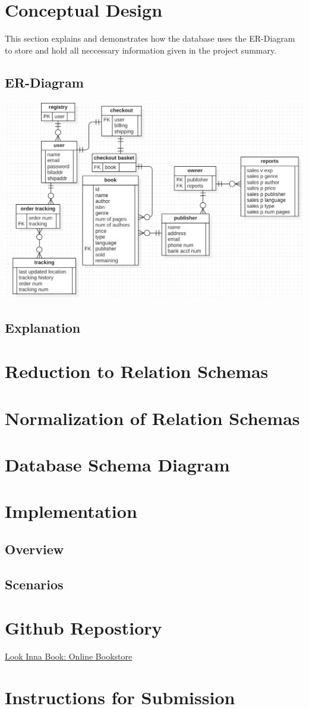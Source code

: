 \documentclass[a4 paper]{article}
\begin{document}

\tableofcontents
\newpage
\section{Conceptual Design}
This section explains and demonstrates how the database uses the ER-Diagram to store and hold all neccessary information given in the project summary. 
\subsection{ER-Diagram}
{\centering \includegraphics[width=\textwidth/1]{ER_D.png}}
\subsection{Explanation}
\section{Reduction to Relation Schemas}
\section{Normalization of Relation Schemas}
\section{Database Schema Diagram}
\section{Implementation}
\subsection{Overview}
\subsection{Scenarios}
\section{Github Repostiory}
\href{https://github.com/WalterMitty2112/Online-Bookstore-Webapp}{Look Inna Book: Online Bookstore}
\section{Instructions for Submission}
\end{document}

